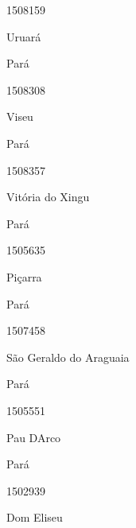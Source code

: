 \documentclass[
  letterpaper,
]{report}
\begin{document}
1508159

\n      

Uruará

\n    

\n    

\n      

Pará

\n      

1508308

\n      

Viseu

\n    

\n    

\n      

Pará

\n      

1508357

\n      

Vitória do Xingu

\n    

\n    

\n      

Pará

\n      

1505635

\n      

Piçarra

\n    

\n    

\n      

Pará

\n      

1507458

\n      

São Geraldo do Araguaia

\n    

\n    

\n      

Pará

\n      

1505551

\n      

Pau D\textquotesingle Arco

\n    

\n    

\n      

Pará

\n      

1502939

\n      

Dom Eliseu

\n    

\n    
\end{document}
